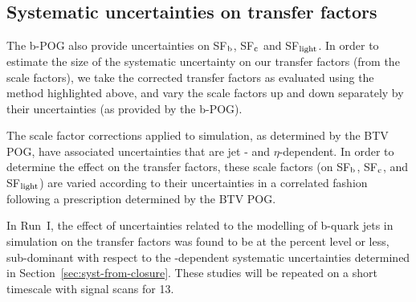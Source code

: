 \subsection{Systematic uncertainties on transfer factors\label{sec:btag-syst}}

The b-POG also provide uncertainties on SF$_{\rm b}$, SF$_{\rm c}$ and
SF$_{\rm light}$. In order to estimate the size of the systematic
uncertainty on our transfer factors (from the scale factors), we
take the corrected transfer factors as evaluated using the method
highlighted above, and vary the scale factors up and down separately
by their uncertainties (as provided by the b-POG).

The scale factor corrections applied to simulation, as determined by
the BTV POG, have associated uncertainties that are jet \Pt- and
$\eta$-dependent. In order to determine the effect on the transfer
factors, these scale factors (on SF$_{\rm b}$, SF$_{\rm c}$, and SF$_{\rm light}$)
are varied according to their uncertainties in a correlated fashion
following a prescription determined by the BTV POG. 

In Run~I, the effect of uncertainties related to the modelling of
b-quark jets in simulation on the transfer factors was found to be at
the percent level or less, \ie sub-dominant with respect to the
\scalht-dependent systematic uncertainties determined in
Section~\ref{sec:syst-from-closure}. These studies will be repeated on
a short timescale with signal scans for 13\TeV.

